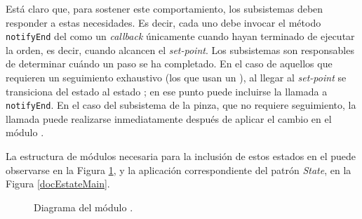 Está claro que, para sostener este comportamiento, los subsistemas deben responder a estas necesidades. Es decir, cada uno debe invocar el método \verb|notifyEnd| del \MainController como un \textit{callback} únicamente cuando hayan terminado de ejecutar la orden, es decir, cuando alcancen el \textit{set-point}. Los subsistemas son responsables de determinar cuándo un paso se ha completado. En el caso de aquellos que requieren un seguimiento exhaustivo (los que usan un \ControlSeguimiento), al llegar al \textit{set-point} se transiciona del estado \Moving al estado \Waiting; en ese punto puede incluirse la llamada a \verb|notifyEnd|. En el caso del subsistema de la pinza, que no requiere seguimiento, la llamada puede realizarse inmediatamente después de aplicar el cambio en el módulo \Pinza.

La estructura de módulos necesaria para la inclusión de estos estados en el \MainController puede observarse en la Figura \ref{maincontroller}, y la aplicación correspondiente del patrón \textit{State}, en la Figura \ref{docEstateMain}.

\begin{figure}[h]
\caption{Diagrama del módulo \MainController.}
\label{maincontroller}
\begin{center}
\end{center}

\end{figure}

